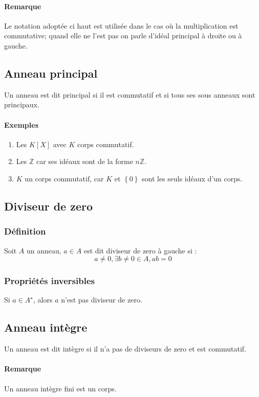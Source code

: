 \documentclass[a4paper,10pt]{article}
\newcommand{\set}[1]{\left\lbrace #1 \right\rbrace } %
\newcommand{\ZZ}{\mathbb{Z}} %
\begin{document}
   \paragraph{Remarque} Le notation adoptée ci haut est utilisée dans le cas où
   la multiplication est commutative; quand elle ne l'est pas on parle d'idéal
   principal à droite ou à gauche.

 \subsection{Anneau principal}
  Un anneau est dit principal si il est commutatif et si tous ses sous anneaux
  sont principaux.
  \paragraph{Exemples}
  \begin{enumerate}
    \item Les $K[X]$ avec $K$ corps commutatif.
    \item Les $\ZZ$ car ses idéaux sont de la forme $n\ZZ$.
    \item $K$ un corps commutatif, car $K$ et $\set{0}$ sont les seuls idéaux
      d'un corps. 
  \end{enumerate}

 \subsection{Diviseur de zero}
  \subsubsection{Définition}
   Soit $A$ un anneau, $a \in A$ est dit diviseur de zero à gauche si :
    $$a\neq 0, \exists b\neq 0\in A, ab=0$$
  \subsubsection{Propriétés inversibles}
   Si $a\in A^\star$, alors $a$ n'est pas diviseur de zero.

 \subsection{Anneau intègre}
  Un anneau est dit intègre si il n'a pas de diviseurs de zero et est commutatif.

  \paragraph{Remarque} Un anneau intègre fini est un corps.
\end{document}
